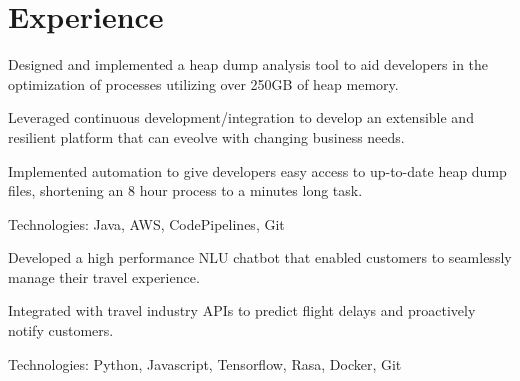 \documentclass[]{deedy-resume-openfont}
\begin{document}
%
%
\lastupdated

%
%

%
%

\begin{minipage}[t]{0.64\textwidth} 


\section{Experience}
\vspace{\topsep} %
\begin{tightemize}
    \item Designed and implemented a heap dump analysis tool to aid developers in the
    optimization of processes utilizing over 250GB of heap memory.
    \item Leveraged continuous development/integration to develop an extensible
    and resilient platform that can eveolve with changing business needs.
    \item Implemented automation to give developers easy access to up-to-date 
    heap dump files, shortening an 8 hour process to a minutes long task.
    \item Technologies: Java, AWS, CodePipelines, Git
    \end{tightemize}
\sectionsep

\begin{tightemize}
    \item Developed a high performance NLU chatbot that enabled customers to seamlessly 
    manage their travel experience.
    \item Integrated with travel industry APIs to predict flight delays and proactively
    notify customers.
    \item Technologies: Python, Javascript, Tensorflow, Rasa, Docker, Git
    \end{tightemize}
\sectionsep


\end{minipage}
\end{document}

